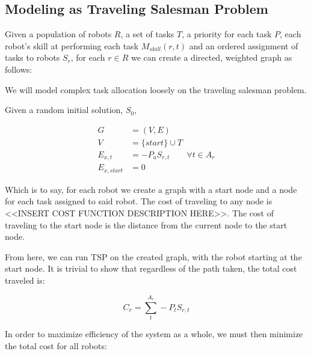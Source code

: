 \documentclass[a4paper]{article}
\begin{document}
\subsection{Modeling as Traveling Salesman Problem}


Given a population of robots $R$, a set of tasks $T$, a priority for each task $P$, each robot's skill at performing each task $M_{skill}(r,t)$ and an ordered assignment of tasks to robots $S_r$, for each $r \in R$
we can create a directed, weighted graph as follows:

We will model complex task allocation loosely on the traveling salesman problem.

Given a random initial solution, $S_0$,

\begin{align*}
	G &= (V, E) \\
	V &= \{ start \} \cup T \\
	E_{x, t} &= -P_a S_{r,t} \qquad \forall t \in A_r \\
	E_{x, start} &= 0
\end{align*}

Which is to say, for each robot we create a graph with a start node and a node for each task assigned to said robot. The cost of traveling to any node is <<INSERT COST FUNCTION DESCRIPTION HERE>>. The cost of traveling to the start node is the distance from the current node to the start node.

From here, we can run TSP on the created graph, with the robot starting at the start node. It is trivial to show that regardless of the path taken, the total cost traveled is:

$$C_r = \sum_t^{A_r} -P_t S_{r,t}$$

In order to maximize efficiency of the system as a whole, we must then minimize the total cost for all robots:
\end{document}
